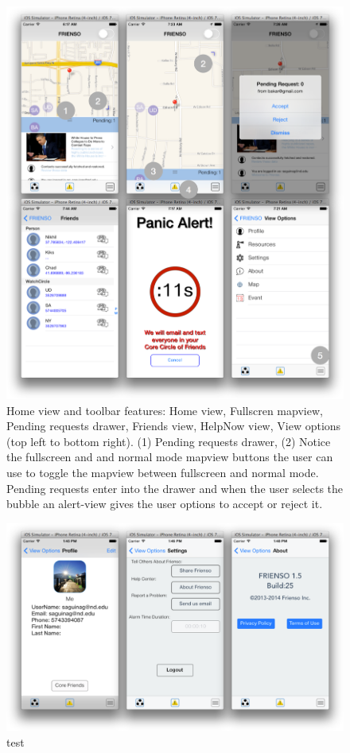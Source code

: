 \begin{figure}[ht!]
 \centering
   \includegraphics[width=\textwidth]{images/mvp_actual1.png}
    \caption{
	Home view and toolbar features: Home view, Fullscren mapview, Pending requests drawer, 
	Friends view, HelpNow view, View options (top left to bottom right). (1) Pending
	requests drawer, (2) Notice the fullscreen and and normal mode mapview buttons the user can
	use to toggle the mapview between fullscreen and normal mode.  Pending requests
	enter into the drawer and when the user selects the bubble an alert-view gives the 
	user options to accept or reject it.
	}
	\end{figure}


\begin{figure}[ht!]
 \centering
   \includegraphics[width=\textwidth]{images/mvp_actual2.png}
    \caption{
	test
	}
	\end{figure}
	
